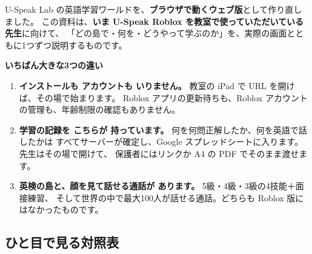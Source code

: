 \documentclass[a4paper,10.5pt]{article}
\begin{document}
U-Speak Lab の英語学習ワールドを、\textbf{ブラウザで動くウェブ版}として作り直しました。
この資料は、\textbf{いま U-Speak Roblox を教室で使っていただいている先生}に向けて、
「どの島で・何を・どうやって学ぶのか」を、実際の画面とともに1つずつ説明するものです。

\begin{diffbox}
\textbf{いちばん大きな3つの違い}
\begin{enumerate}[leftmargin=18pt, itemsep=2pt]
  \item \textbf{インストールも アカウントも いりません。} 教室の iPad で URL を開けば、その場で始まります。
        Roblox アプリの更新待ちも、Roblox アカウントの管理も、年齢制限の確認もありません。
  \item \textbf{学習の記録を こちらが 持っています。} 何を何問正解したか、何を英語で話したかは
        すべてサーバーが確定し、Google スプレッドシートに入ります。先生はその場で開けて、
        保護者にはリンクか A4 の PDF でそのまま渡せます。
  \item \textbf{英検の島と、顔を見て話せる通話が あります。} 5級・4級・3級の4技能＋面接練習、
        そして世界の中で最大100人が話せる通話。どちらも Roblox 版にはなかったものです。
\end{enumerate}
\end{diffbox}

\subsection{ひと目で見る対照表}
\end{document}
